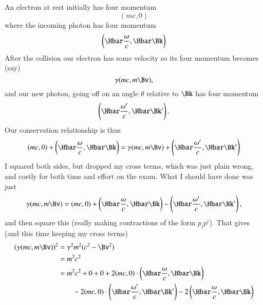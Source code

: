 {An electron at rest initially has four momentum
%
\begin{equation}\label{eqn:relativisticElectrodynamicsExamReflection:310}
(m c, 0)
\end{equation}
%
where the incoming photon has four momentum
%
\begin{equation}\label{eqn:relativisticElectrodynamicsExamReflection:330}
\left(\Hbar \frac{\omega}{c}, \Hbar \Bk \right)
\end{equation}
%
After the collision our electron has some velocity so its four momentum becomes (say)
%
\begin{equation}\label{eqn:relativisticElectrodynamicsExamReflection:350}
\gamma (m c, m \Bv),
\end{equation}
and our new photon, going off on an angle \(\theta\) relative to \(\Bk\) has four momentum
%
\begin{equation}\label{eqn:relativisticElectrodynamicsExamReflection:370}
\left(\Hbar \frac{\omega'}{c}, \Hbar \Bk' \right).
\end{equation}
Our conservation relationship is thus
\begin{equation}\label{eqn:relativisticElectrodynamicsExamReflection:390}
(m c, 0) + \left(\Hbar \frac{\omega}{c}, \Hbar \Bk \right)
=
\gamma (m c, m \Bv)
+
\left(\Hbar \frac{\omega'}{c}, \Hbar \Bk' \right)
\end{equation}
%
I squared both sides, but dropped my cross terms, which was just plain wrong, and costly for both time and effort on the exam.  What I should have done was just
%
\begin{equation}\label{eqn:relativisticElectrodynamicsExamReflection:410}
\gamma (m c, m \Bv) =
(m c, 0) + \left(\Hbar \frac{\omega}{c}, \Hbar \Bk \right)
-\left(\Hbar \frac{\omega'}{c}, \Hbar \Bk' \right),
\end{equation}
%
and then square this (really making contractions of the form \(p_i p^i\)).  That gives (and this time keeping my cross terms)
%
\begin{equation}\label{eqn:relativisticElectrodynamicsExamReflection:1350}
\begin{aligned}
(\gamma (m c, m \Bv) )^2
&= \gamma^2 m^2 (c^2 - \Bv^2) \\
&= m^2 c^2 \\
&=
m^2 c^2 + 0 + 0
+ 2 (m c, 0)
\cdot \left(\Hbar \frac{\omega}{c}, \Hbar \Bk \right) \\
&\qquad - 2 (m c, 0) \cdot \left(\Hbar \frac{\omega'}{c}, \Hbar \Bk' \right)
- 2
\left(\Hbar \frac{\omega}{c}, \Hbar \Bk \right)

\end{aligned}
\end{equation}}
